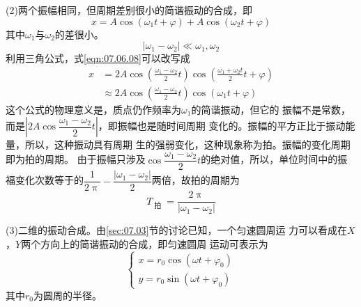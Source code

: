 (2)两个振幅相同，但周期差别很小的简谐振动的合成，即
\begin{equation}\label{eqn:07.06.08}
    x = A \cos \left( \omega _ { 1 } t + \varphi \right) + A  \cos \left( \omega _ { 2 } t + \varphi \right)
\end{equation}
其中$\omega_{ 1 }$与$\omega_{ 2 }$的差很小。
\begin{equation*}
    \left| \omega _ { 1 } - \omega _ { 2 } \right| \ll \omega _ { 1 } , \omega _ { 2 }
\end{equation*}
利用三角公式，式\eqref{eqn:07.06.08}可以改写成
\begin{equation*}
    \begin{split}
        x &= 2 A  \cos \left( \frac { \omega _ { 1 } - \omega _ { 2 } } { 2 } t \right)  \cos \left( \frac { \omega _ { 1 } + \omega _ { 2 } t } { 2 } t  + \varphi \right)  \\
        & \approx 2 A  \cos \left( \frac { \omega _ { 1 } - \omega _ { 2 } } { 2 } t \right)  \cos \left( \omega _ { 1 } t + \varphi \right)
    \end{split}
\end{equation*}
这个公式的物理意义是，质点仍作频率为$\omega_{ 1 }$的简谐振动，但它的
振幅不是常数，而是$ \left| 2 A  \cos \dfrac { \omega _ { 1 } - \omega _ { 2 } } { 2 } t \right| $，即振幅也是随时间周期
变化的。振幅的平方正比于振动能量，所以，这种振动具有周期
生的强弱变化，这种现象称为拍。振幅的变化周期即为拍的周期。
由于振幅只涉及$ \cos \dfrac { \omega _ { 1 } - \omega _ { 2 } } { 2 } t $的绝对值，所以，单位时间中的振
福变化次数等于的$ \dfrac { 1 } { 2 \uppi } - \dfrac { \left| \omega _ { 1 } - \omega _ { 2 } \right| } { 2 } $两倍，故拍的周期为
\begin{equation*}
    T _ { \text { 拍 } } = \frac { 2 \uppi } { \left| \omega _ { 1 } - \omega _ { 2 } \right| }
\end{equation*}

(3)二维的振动合成。由\ref{sec:07.03}节的讨论已知，一个匀速圆周运
力可以看成在$ X $，$ Y $两个方向上的简谐振动的合成，即匀速圆周
运动可表示为
\begin{equation}\label{eqn:07.06.09}
    \begin{cases}
        x = r _ { 0 } \cos \left( \omega t + \varphi _ { 0 } \right) \\
        y = r _ { 0 } \sin \left( \omega t + \varphi _ { 0 } \right)
    \end{cases}
\end{equation}
其中$ r _ { 0 } $为圆周的半径。

